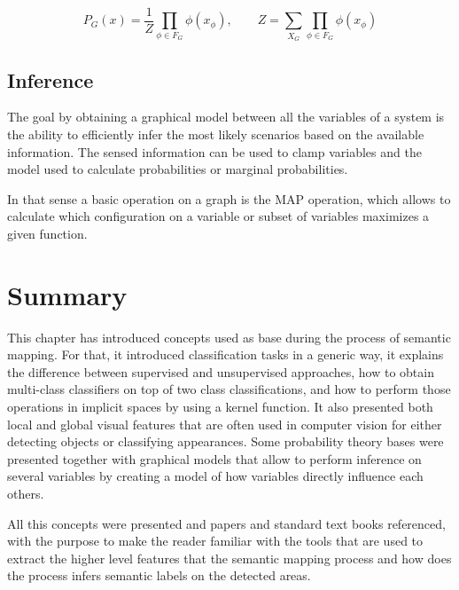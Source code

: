 \begin{equation}
P_G(x) = \frac{1}{Z}\prod_{\phi \in F_G}{\phi(x_{\phi})},\qquad
Z = \sum_{X_G}\prod_{\phi \in F_G}{\phi(x_{\phi})}
\end{equation}

\subsection{Inference}
The goal by obtaining a graphical model between all the variables of a system is the ability
to efficiently infer the most likely scenarios based on the available information.
The sensed information can be used to clamp variables and the model used to calculate probabilities
or marginal probabilities.

In that sense a basic operation on a graph is the \gls{MAP} operation, which allows to calculate
which configuration on a variable or subset of variables maximizes a given function.

\section{Summary}
This chapter has introduced concepts used as base during the process of semantic mapping.
For that, it introduced classification tasks in a generic way, it explains the
difference between supervised and unsupervised approaches, how to obtain multi-class
classifiers on top of two class classifications, and how to perform those operations
in implicit spaces by using a kernel function.
It also presented both local and global visual features that are often used in
computer vision for either detecting objects or classifying appearances.
Some probability theory bases were presented together with graphical models that
allow to perform inference on several variables by creating a model of how variables
directly influence each others.

All this concepts were presented and papers and standard text books referenced, 
with the purpose to make the reader familiar with the tools that are used
to extract the higher level features that the semantic mapping process and how does
the process infers semantic labels on the detected areas.
